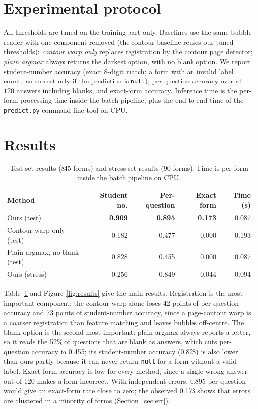 \documentclass{article}
\begin{document}
\section{Experimental protocol}
All thresholds are tuned on the training part only. Baselines use the same bubble reader with one
component removed (the contour baseline reuses our tuned thresholds): \emph{contour warp only} replaces registration by the
contour page detector; \emph{plain argmax} always returns the darkest option, with no blank
option. We report student-number accuracy (exact 8-digit match; a form with an invalid label counts
as correct only if the prediction is \texttt{null}), per-question accuracy over all $120$ answers
including blanks, and exact-form accuracy. Inference time is the per-form processing time inside the
batch pipeline, plus the end-to-end time of the \texttt{predict.py} command-line tool on CPU.

\section{Results}
\begin{table}[t]
\centering\small
\caption{Test-set results (845 forms) and stress-set results (90 forms). Time is per form inside
the batch pipeline on CPU.}
\label{tab:main}
\begin{tabular}{lrrrr}
\toprule
Method & Student no. & Per-question & Exact form & Time (s) \\
\midrule
Ours (test)                     & \textbf{0.909} & \textbf{0.895} & \textbf{0.173} & 0.087 \\
Contour warp only (test)        & 0.182 & 0.477 & 0.000 & 0.193 \\
Plain argmax, no blank (test)   & 0.828 & 0.455 & 0.000 & 0.087 \\
\midrule
Ours (stress)                   & 0.256 & 0.849 & 0.044 & 0.094 \\
\bottomrule
\end{tabular}
\end{table}

Table~\ref{tab:main} and Figure~\ref{fig:results} give the main results. Registration is the most
important component: the contour warp alone loses 42 points of per-question accuracy and 73
points of student-number accuracy, since a page-contour warp is a coarser registration than feature
matching and leaves bubbles off-centre. The blank option is the second most important: plain argmax
always reports a letter, so it reads the 52\% of questions that are blank as answers, which cuts
per-question accuracy to 0.455; its student-number accuracy (0.828) is also lower than ours partly
because it can never return \texttt{null} for a form without a valid label. Exact-form accuracy is
low for every method, since a single wrong answer out of 120 makes a form incorrect. With independent
errors, 0.895 per question would give an exact-form rate close to zero; the observed 0.173 shows that
errors are clustered in a minority of forms (Section~\ref{sec:err}).
\end{document}
